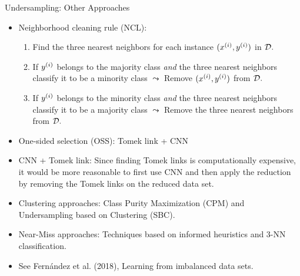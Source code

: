 	\begin{frame}{Undersampling: Other Approaches}
		\footnotesize
		\begin{itemize}
%			
			\item Neighborhood cleaning rule (NCL):
%			
			\begin{enumerate} \footnotesize
%				
				\item Find the three nearest neighbors for each instance $(x^{(i)},y^{(i)})$ in $\mathcal{D}.$
%				
				\item If $y^{(i)}$ belongs to the majority class \emph{and} the three nearest neighbors classify it to be a minority class $\leadsto$ Remove $(x^{(i)},y^{(i)})$ from $\mathcal{D}.$
%				
				\item If $y^{(i)}$ belongs to the minority class \emph{and} the three nearest neighbors classify it to be a majority class $\leadsto$ Remove the three nearest neighbors from $\mathcal{D}.$
%				
			\end{enumerate} 
%			
			\item One-sided selection (OSS): Tomek link + CNN
%			
			\item CNN + Tomek link: Since finding Tomek links is computationally expensive, it would be more reasonable to first use CNN and then apply the reduction by removing the Tomek links on the reduced data set.
%			
			\item Clustering approaches: Class Purity Maximization (CPM) and Undersampling based on Clustering (SBC).
%			
			\item Near-Miss approaches: Techniques based on informed heuristics and 3-NN classification.
%			
			\item See Fern\'andez et al. (2018), Learning from imbalanced data sets.
%
		\end{itemize}
	\end{frame}
	
